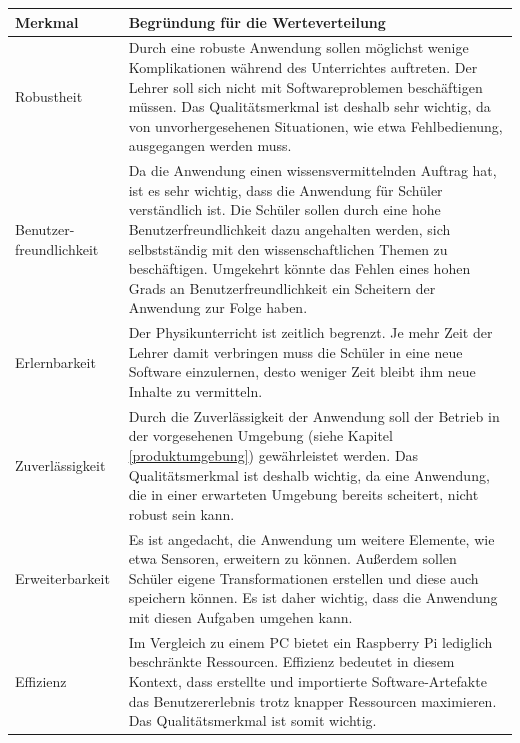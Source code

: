 \documentclass[parskip=full]{scrartcl}
\begin{document}
\begin{tabular}{| p{3cm} | p{10cm} |}
	\hline
	\textbf{Merkmal} & \textbf{Begründung für die Werteverteilung}\\
	\hline
	
	Robustheit & Durch eine robuste Anwendung sollen möglichst wenige Komplikationen während des Unterrichtes auftreten. Der Lehrer soll sich nicht mit Softwareproblemen beschäftigen müssen. Das Qualitätsmerkmal ist deshalb sehr wichtig, da von unvorhergesehenen Situationen, wie etwa Fehlbedienung, ausgegangen werden muss.\\\cline{1-2}
	
	Benutzer-\newline freundlichkeit & Da die Anwendung einen wissensvermittelnden Auftrag hat, ist es sehr wichtig, dass die Anwendung für Schüler verständlich ist. Die Schüler sollen durch eine hohe Benutzerfreundlichkeit dazu angehalten werden, sich selbstständig mit den wissenschaftlichen Themen zu beschäftigen. Umgekehrt könnte das Fehlen eines hohen Grads an Benutzerfreundlichkeit ein Scheitern der Anwendung zur Folge haben.\\\cline{1-2}
	
	Erlernbarkeit & Der Physikunterricht ist zeitlich begrenzt. Je mehr Zeit der Lehrer damit verbringen muss die Schüler in eine neue Software einzulernen, desto weniger Zeit bleibt ihm neue Inhalte zu vermitteln.\\\cline{1-2}
		
	Zuverlässigkeit & Durch die Zuverlässigkeit der Anwendung soll der Betrieb in der vorgesehenen Umgebung (siehe Kapitel \ref{produktumgebung}) gewährleistet werden. Das Qualitätsmerkmal ist deshalb wichtig, da eine Anwendung, die in einer erwarteten Umgebung bereits scheitert, nicht robust sein kann.\\\cline{1-2}
	
	Erweiterbarkeit & Es ist angedacht, die Anwendung um weitere Elemente, wie etwa Sensoren, erweitern zu können. Außerdem sollen Schüler eigene Transformationen erstellen und diese auch speichern können. Es ist daher wichtig, dass die Anwendung mit diesen Aufgaben umgehen kann.\\\cline{1-2}
	
	Effizienz & Im Vergleich zu einem PC bietet ein Raspberry Pi lediglich beschränkte Ressourcen. Effizienz bedeutet in diesem Kontext, dass erstellte und importierte Software-Artefakte das Benutzererlebnis trotz knapper Ressourcen maximieren. Das Qualitätsmerkmal ist somit wichtig.\\\cline{1-2}
	

\end{tabular}
\end{document}

